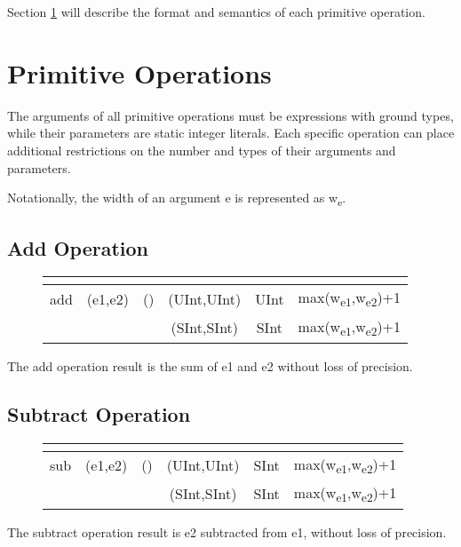 \documentclass[12pt]{article}
\begin{document}
Section \ref{primitives} will describe the format and semantics of each primitive operation.

\section{Primitive Operations} \label{primitives}

\newcommand{\vv}[1]{{\ttfamily #1}}
\newcommand{\ts}[1]{\textsubscript{#1}}
\newcommand{\nf}[1]{\normalfont{\textbf{#1}}}
\newcommand{\opheader}{
 \hline
    \multicolumn{1}{|c|}{\nf{Name}} 
  & \multicolumn{1}{c|}{\nf{Arguments}}
  & \multicolumn{1}{c|}{\nf{Parameters}}
  & \multicolumn{1}{c|}{\nf{Arg Types}}
  & \multicolumn{1}{c|}{\nf{Result Type}}
  & \multicolumn{1}{c|}{\nf{Result Width}}\\
\hline  
}

The arguments of all primitive operations must be expressions with ground types, while their parameters are static integer literals. Each specific operation can place additional restrictions on the number and types of their arguments and parameters.

Notationally, the width of an argument \vv{e} is represented as \vv{w}\ts{e}.

\subsection{Add Operation}

\begin{figure}[H]
{ \fontsize{10pt}{1.10em}\selectfont
{\ttfamily
\begin{tabular}{ |c|c|c|c|c|c| }   
  \opheader 
add & (e1,e2) & () & (UInt,UInt) & UInt & max(w\ts{e1},w\ts{e2})+1\\
                 &&& (SInt,SInt) & SInt & max(w\ts{e1},w\ts{e2})+1\\
 \hline
\end{tabular}
}}
\end{figure}
The add operation result is the sum of \vv{e1} and \vv{e2} without loss of precision.

\subsection{Subtract Operation}

\begin{figure}[H]
{ \fontsize{10pt}{1.10em}\selectfont
{\ttfamily
\begin{tabular}{ |c|c|c|c|c|c| }   
  \opheader 
sub & (e1,e2) & () & (UInt,UInt) & SInt & max(w\ts{e1},w\ts{e2})+1\\
                 &&& (SInt,SInt) & SInt & max(w\ts{e1},w\ts{e2})+1\\
 \hline
\end{tabular}
}}
\end{figure}
The subtract operation result is \vv{e2} subtracted from \vv{e1}, without loss of precision.
\end{document}
